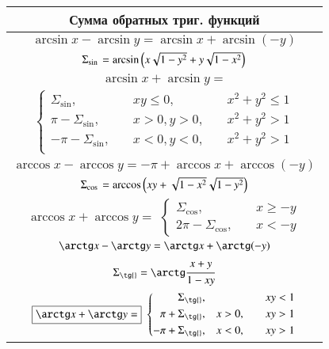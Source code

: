 \documentclass[twoside, a4paperpt, fleqn]{extarticle}
\begin{document}
    
    \begin{tabu}[t]{|c|}
        \hline
            \textbf{Сумма обратных триг. функций} \\
        \hline
            $ \arcsin x - \arcsin y =  \arcsin x + \arcsin(-y) $ \\
            $ \Sigma_{\sin{}} = \arcsin\left(x\sqrt{\mathstrut 1-y^2}+y\sqrt{\mathstrut 1-x^2}\right) $ \\
        \hline
            $ \boxed{\arcsin x + \arcsin y =} $ \\
            $ \left\{ \begin{aligned}
                \Sigma_{\sin{}}, \quad & xy \leqslant 0,\quad & x^2 + y^2 \leqslant 1 \\
                \pi-\Sigma_{\sin{}}, \quad & x > 0, y > 0,\quad  & x^2 + y^2 > 1 \\
                -\pi-\Sigma_{\sin{}}, \quad & x < 0, y < 0,\quad & x^2 + y^2 > 1 \\
            \end{aligned} \right. $ \\
        \hline
            $ \arccos x - \arccos y =  -\pi + \arccos x + \arccos(-y) $ \\
            $ \Sigma_{\cos{}} = \arccos\left(xy+\sqrt{\mathstrut 1-x^2}\sqrt{\mathstrut 1-y^2}\right) $ \\
        \hline
            $ \boxed{\arccos x + \arccos y =} $
            $ \left\{ \begin{aligned}
                \Sigma_{\cos{}}, \quad & x \geqslant -y \\
                2\pi-\Sigma_{\cos{}}, \quad & x < -y
            \end{aligned} \right. $ \\
        \hline
            $ \arctg x - \arctg y =  \arctg x + \arctg(-y) $ \\
            $ \Sigma_{\tg{}} = \arctg\cfrac{x+y}{1-xy} $ \\
        \hline
            $ \boxed{\arctg x + \arctg y =} $
            $ \left\{ \begin{aligned}
                \Sigma_{\tg{}}, \quad & & xy < 1 \\
                \pi+\Sigma_{\tg{}}, \quad & x > 0, \quad & xy>1 \\
                -\pi+\Sigma_{\tg{}}, \quad & x < 0, \quad & xy>1 \\
            \end{aligned} \right. $ \\
        \hline
    \end{tabu}
\end{document}
